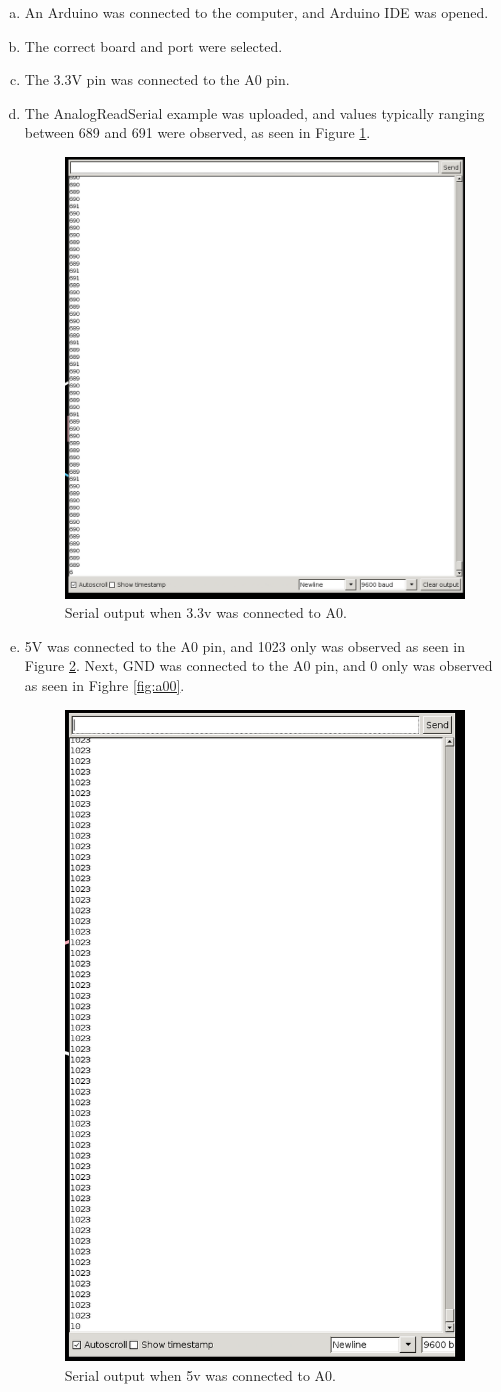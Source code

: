 \documentclass[12pt]{article}
\begin{document}
\begin{enumerate}[a.]
    \item An Arduino was connected to the computer, and Arduino IDE was opened.
    \item The correct board and port were selected. 
    \item The 3.3V pin was connected to the A0 pin.
    \item The AnalogReadSerial example was uploaded, and values typically ranging between 689
    and 691 were observed, as seen in Figure \ref{fig:a03}.
    \begin{figure}[H]
        \centering
        \includegraphics[width=0.5\linewidth]{sermon.png}
        \caption{Serial output when 3.3v was connected to A0.}
        \label{fig:a03}
    \end{figure}
        
    \item 5V was connected to the A0 pin, and 1023 only was observed as seen in Figure \ref{fig:a05}. 
        Next, GND was connected to the A0 pin, and 0 only was observed as seen in Fighre \ref{fig:a00}.
    
        \begin{figure}[H]
            \centering
            \includegraphics[width=0.4\linewidth]{5v.png}
            \caption{Serial output when 5v was connected to A0.}
            \label{fig:a05}
        \end{figure}
        

\end{enumerate}
\end{document}
